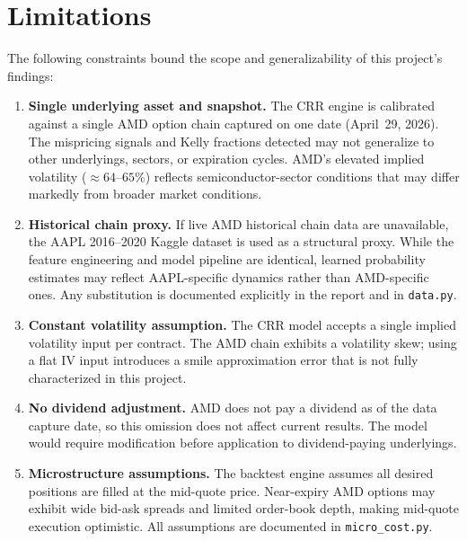\documentclass[12pt, letterpaper]{article}
\let\oldsection\section
\renewcommand{\section}{\clearpage\oldsection}
\begin{document}
\section{Limitations}
\label{sec:limitations}

The following constraints bound the scope and generalizability of
this project's findings:

\begin{enumerate}
  \item \textbf{Single underlying asset and snapshot.}  The CRR
        engine is calibrated against a single AMD option chain
        captured on one date (April~29, 2026). The mispricing
        signals and Kelly fractions detected may not generalize to
        other underlyings, sectors, or expiration cycles. AMD's
        elevated implied volatility ($\approx 64$--$65\%$) reflects
        semiconductor-sector conditions that may differ markedly
        from broader market conditions.

  \item \textbf{Historical chain proxy.}  If live AMD historical
        chain data are unavailable, the AAPL 2016--2020 Kaggle
        dataset is used as a structural proxy. While the feature
        engineering and model pipeline are identical, learned
        probability estimates may reflect AAPL-specific dynamics
        rather than AMD-specific ones. Any substitution is
        documented explicitly in the report and in
        \texttt{data.py}.

  \item \textbf{Constant volatility assumption.}  The CRR model
        accepts a single implied volatility input per contract.
        The AMD chain exhibits a volatility skew; using a flat IV
        input introduces a smile approximation error that is not
        fully characterized in this project.

  \item \textbf{No dividend adjustment.}  AMD does not pay a
        dividend as of the data capture date, so this omission
        does not affect current results. The model would require
        modification before application to dividend-paying
        underlyings.

  \item \textbf{Microstructure assumptions.}  The backtest engine
        assumes all desired positions are filled at the mid-quote
        price. Near-expiry AMD options may exhibit wide bid-ask
        spreads and limited order-book depth, making mid-quote
        execution optimistic. All assumptions are documented in
        \texttt{micro\_cost.py}.


\end{enumerate}
\end{document}
